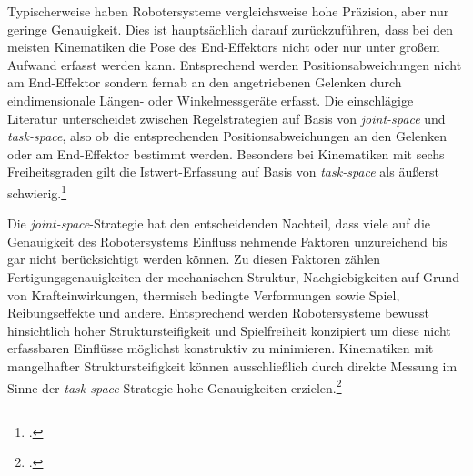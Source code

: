 Typischerweise haben Robotersysteme vergleichsweise hohe Präzision, aber nur geringe Genauigkeit. Dies ist hauptsächlich darauf zurückzuführen, dass bei den meisten Kinematiken die Pose des End-Effektors nicht oder nur unter großem Aufwand erfasst werden kann. Entsprechend werden Positionsabweichungen nicht am End-Effektor sondern fernab an den angetriebenen Gelenken durch eindimensionale Längen- oder Winkelmessgeräte erfasst. Die einschlägige Literatur unterscheidet zwischen Regelstrategien auf Basis von \emph{joint-space} und \emph{task-space}, also ob die entsprechenden Positionsabweichungen an den Gelenken oder am End-Effektor bestimmt werden. Besonders bei Kinematiken mit sechs Freiheitsgraden gilt die Istwert-Erfassung auf Basis von \emph{task-space} als äußerst schwierig.\footcite[Vgl.][671]{Ting2013} 

Die \emph{joint-space}-Strategie hat den entscheidenden Nachteil, dass viele auf die Genauigkeit des Robotersystems Einfluss nehmende Faktoren unzureichend bis gar nicht berücksichtigt werden können. Zu diesen Faktoren zählen Fertigungsgenauigkeiten der mechanischen Struktur, Nachgiebigkeiten auf Grund von Krafteinwirkungen, thermisch bedingte Verformungen sowie Spiel, Reibungseffekte und andere. Entsprechend werden Robotersysteme bewusst hinsichtlich hoher Struktursteifigkeit und Spielfreiheit konzipiert um diese nicht erfassbaren Einflüsse möglichst konstruktiv zu minimieren. Kinematiken mit mangelhafter Struktursteifigkeit können ausschließlich durch direkte Messung im Sinne der \emph{task-space}-Strategie hohe Genauigkeiten erzielen.\footcite[Vgl.][20-21]{Spong2004}

